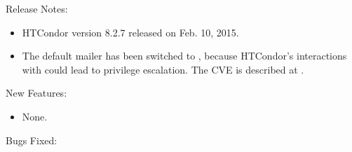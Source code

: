 \noindent Release Notes:

\begin{itemize}

\item HTCondor version 8.2.7 released on Feb. 10, 2015.

\item \Security The default mailer has been switched to ,
because HTCondor's interactions with  could lead
to privilege escalation.
The CVE is described at
.

\end{itemize}


\noindent New Features:

\begin{itemize}

\item None.

\end{itemize}

\noindent Bugs Fixed:

